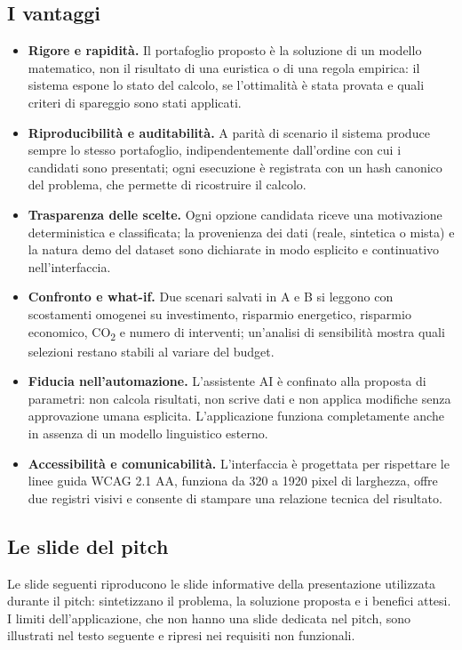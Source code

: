 \subsection*{I vantaggi}
\begin{itemize}[leftmargin=1.4em, itemsep=0.25em]
    \item \textbf{Rigore e rapidità.} Il portafoglio proposto è la soluzione di un modello matematico, non il risultato di una euristica o di una regola empirica: il sistema espone lo stato del calcolo, se l'ottimalità è stata provata e quali criteri di spareggio sono stati applicati.
    \item \textbf{Riproducibilità e auditabilità.} A parità di scenario il sistema produce sempre lo stesso portafoglio, indipendentemente dall'ordine con cui i candidati sono presentati; ogni esecuzione è registrata con un hash canonico del problema, che permette di ricostruire il calcolo.
    \item \textbf{Trasparenza delle scelte.} Ogni opzione candidata riceve una motivazione deterministica e classificata; la provenienza dei dati (reale, sintetica o mista) e la natura demo del dataset sono dichiarate in modo esplicito e continuativo nell'interfaccia.
    \item \textbf{Confronto e what-if.} Due scenari salvati in A e B si leggono con scostamenti omogenei su investimento, risparmio energetico, risparmio economico, CO\textsubscript{2} e numero di interventi; un'analisi di sensibilità mostra quali selezioni restano stabili al variare del budget.
    \item \textbf{Fiducia nell'automazione.} L'assistente AI è confinato alla proposta di parametri: non calcola risultati, non scrive dati e non applica modifiche senza approvazione umana esplicita. L'applicazione funziona completamente anche in assenza di un modello linguistico esterno.
    \item \textbf{Accessibilità e comunicabilità.} L'interfaccia è progettata per rispettare le linee guida WCAG 2.1 AA, funziona da 320 a 1920 pixel di larghezza, offre due registri visivi e consente di stampare una relazione tecnica del risultato.
\end{itemize}

\subsection*{Le slide del pitch}
Le slide seguenti riproducono le slide informative della presentazione utilizzata durante il pitch: sintetizzano il problema, la soluzione proposta e i benefici attesi. I limiti dell'applicazione, che non hanno una slide dedicata nel pitch, sono illustrati nel testo seguente e ripresi nei requisiti non funzionali.

